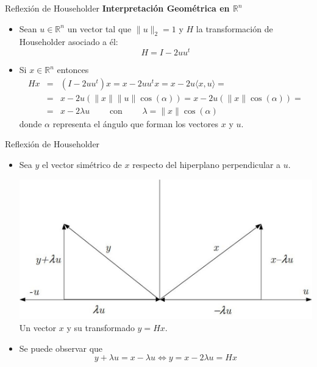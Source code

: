 \documentclass{beamer}
\begin{document}
\begin{frame}{Reflexi\'on de Householder}
  \textbf{Interpretaci\'on Geom\'etrica en $\mathbb{R}^n$}
  \begin{itemize}
   \item Sean $u \in \mathbb{R}^n$ un vector tal que $\|u\|_2=1$ y $H$ la transformaci\'on de Householder asociado a \'el:
   $$
   H = I - 2uu^t
   $$
   \item<2-> Si $x \in \mathbb{R}^n$ entonces
   \begin{eqnarray}
    \nonumber Hx & = & (I - 2uu^t)x = x - 2uu^tx = x-2u\langle x,u\rangle=\\
      \nonumber & = & x-2u(\|x\|\|u\|\cos(\alpha)) = x-2u(\|x\|\cos(\alpha))=\\
    \nonumber & = & x-2\lambda u \qquad \mbox{  con  }\qquad \lambda=\|x\|\cos(\alpha)
    \end{eqnarray}
    donde $\alpha$ representa el \'angulo que forman los vectores $x$ y $u$.
  \end{itemize}
\end{frame}   
\begin{frame}{Reflexi\'on de Householder}
  \begin{itemize}
   \item<1-> Sea $y$ el vector sim\'etrico de $x$ respecto del hiperplano perpendicular a $u$.
   \begin{center}
     \includegraphics[scale=0.3]{./reflex.jpg}\\
     Un vector $x$ y su transformado $y=Hx$.
   \end{center}   
   \item<2-> Se puede observar que 
   $$
   y + \lambda u = x - \lambda u \Longleftrightarrow y = x-2\lambda u = Hx
   $$
  \end{itemize}
\end{frame}
\end{document}
